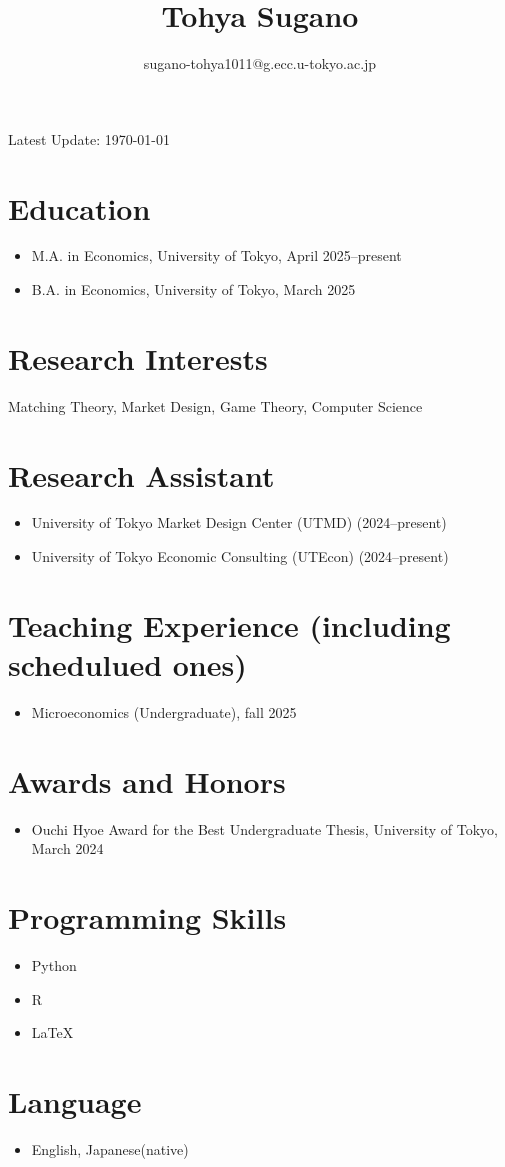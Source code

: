 \documentclass[11pt,a4paper]{article}
\begin{document}
\title{Tohya Sugano}
\author{sugano-tohya1011@g.ecc.u-tokyo.ac.jp}
\date{}
\maketitle

\noindent Latest Update: \today

\section*{Education}
\begin{itemize}
    \item M.A. in Economics, University of Tokyo, April 2025--present
    \item B.A. in Economics, University of Tokyo, March 2025
\end{itemize}

\section*{Research Interests}
Matching Theory, Market Design, Game Theory, Computer Science

\section*{Research Assistant}
\begin{itemize}
    \item University of Tokyo Market Design Center (UTMD) (2024--present)
    \item University of Tokyo Economic Consulting (UTEcon) (2024--present)
\end{itemize}

\section*{Teaching Experience (including schedulued ones)}
\begin{itemize}
    \item Microeconomics (Undergraduate), fall 2025
\end{itemize}


\section*{Awards and Honors}
\begin{itemize}
    \item Ouchi Hyoe Award for the Best Undergraduate Thesis, University of Tokyo, March 2024
\end{itemize}

\section*{Programming Skills}
\begin{itemize}
    \item Python
    \item R
    \item LaTeX
\end{itemize}

\section*{Language}
\begin{itemize}
    \item English, Japanese(native)
\end{itemize}
\end{document}
